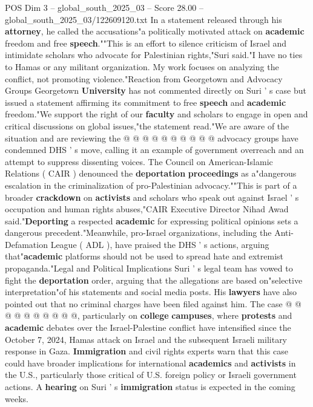 \begin{textsample}{POS Dim 3 – global\_south\_2025\_03 – Score 28.00 – global\_south\_2025\_03/122609120.txt}
In a statement released through his \textbf{attorney}, he called the accusations"a politically motivated attack on \textbf{academic} freedom and free \textbf{speech}.""This is an effort to silence criticism of Israel and intimidate scholars who advocate for Palestinian rights,"Suri said."I have no ties to Hamas or any militant organization.
My work focuses on analyzing the conflict, not promoting violence."Reaction from Georgetown and Advocacy Groups Georgetown \textbf{University} has not commented directly on Suri ' s case but issued a statement affirming its commitment to free \textbf{speech} and \textbf{academic} freedom."We support the right of our \textbf{faculty} and scholars to engage in open and critical discussions on global issues,"the statement read."We are aware of the situation and are reviewing the @ @ @ @ @ @ @ @ @ @ advocacy groups have condemned DHS ' s move, calling it an example of government overreach and an attempt to suppress dissenting voices.
The Council on American-Islamic Relations ( CAIR ) denounced the \textbf{deportation} \textbf{proceedings} as a"dangerous escalation in the criminalization of pro-Palestinian advocacy.""This is part of a broader \textbf{crackdown} on \textbf{activists} and scholars who speak out against Israel ' s occupation and human rights abuses,"CAIR Executive Director Nihad Awad said."\textbf{Deporting} a respected \textbf{academic} for expressing political opinions sets a dangerous precedent."Meanwhile, pro-Israel organizations, including the Anti-Defamation League ( ADL ), have praised the DHS ' s actions, arguing that"\textbf{academic} platforms should not be used to spread hate and extremist propaganda."Legal and Political Implications Suri ' s legal team has vowed to fight the \textbf{deportation} order, arguing that the allegations are based on"selective interpretation"of his statements and social media posts.
His \textbf{lawyers} have also pointed out that no criminal charges have been filed against him.
The case @ @ @ @ @ @ @ @ @ @, particularly on \textbf{college} \textbf{campuses}, where \textbf{protests} and \textbf{academic} debates over the Israel-Palestine conflict have intensified since the October 7, 2024, Hamas attack on Israel and the subsequent Israeli military response in Gaza. \textbf{Immigration} and civil rights experts warn that this case could have broader implications for international \textbf{academics} and \textbf{activists} in the U.S., particularly those critical of U.S. foreign policy or Israeli government actions.
A \textbf{hearing} on Suri ' s \textbf{immigration} status is expected in the coming weeks.

\end{textsample}

